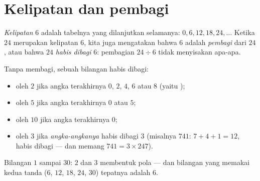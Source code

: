\section{Kelipatan dan pembagi}

\begin{definition}\label{def:g5:division:multiple}
\emph{Kelipatan} $6$ adalah tabelnya yang
dilanjutkan selamanya: $0, 6, 12, 18, 24, \dots$ Ketika $24$
merupakan kelipatan $6$, kita juga mengatakan bahwa $6$ adalah
\emph{pembagi} dari $24$, atau bahwa $24$
\emph{habis dibagi} $6$: pembagian $24 \div 6$ tidak menyisakan apa-apa.
\end{definition}

\begin{proposition}\label{prop:g5:division:criteria}
Tanpa membagi, sebuah bilangan habis dibagi:
\begin{itemize}
  \item oleh $2$ jika angka terakhirnya $0$, $2$, $4$, $6$ atau $8$
        (yaitu );
  \item oleh $5$ jika angka terakhirnya $0$ atau $5$;
  \item oleh $10$ jika angka terakhirnya $0$;
  \item oleh $3$ jika \emph{ angka-angkanya} habis dibagi
        $3$ (misalnya $741$: $7 + 4 + 1 = 12$, habis dibagi --- dan
        memang $741 = 3 \times 247$).
\end{itemize}
\end{proposition}
\admitted

\begin{omfigure}

{\small Bilangan $1$ sampai $30$:  $2$ dan  $3$
membentuk pola --- dan bilangan yang memakai kedua tanda ($6$, $12$,
$18$, $24$, $30$) tepatnya adalah  $6$.}
\end{omfigure}

